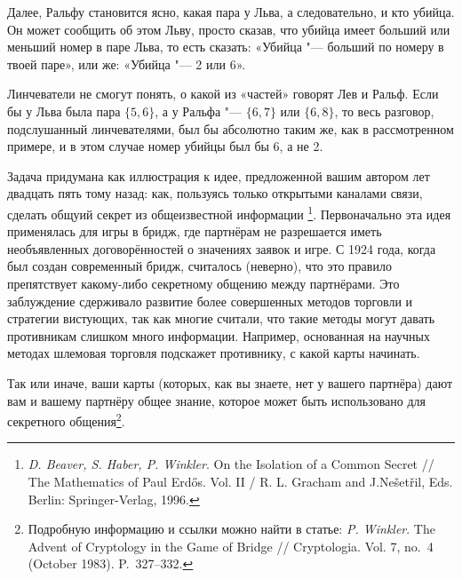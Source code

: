 \documentclass[twoside]{book}
\begin{document}
Далее, Ральфу становится ясно, какая пара у Льва, а следовательно, и кто  убийца.
Он может сообщить об этом Льву, просто сказав, что убийца  имеет больший или меньший номер в паре Льва, то есть сказать: «Убийца "--- больший по номеру в твоей паре», или же: «Убийца "--- 2 или 6».

Линчеватели не смогут понять, о какой из «частей» говорят Лев и Ральф.
Если бы у Льва была пара $\{5,6\}$, а у Ральфа "--- $\{6,7\}$ или $\{6,8\}$, то весь разговор, подслушанный линчевателями, был бы абсолютно таким же, как в рассмотренном примере, и в этом случае номер убийцы был бы 6, а не 2.
\heart

\medskip
Задача придумана как иллюстрация к идее, предложенной вашим автором лет двадцать пять тому назад:
как, пользуясь только открытыми каналами связи, сделать общуий секрет из общеизвестной информации%
\footnote{\emph{D. Beaver, S. Haber, P. Winkler}. On the Isolation of a Common Secret /\!/ {The Mathematics of Paul Erd\H{o}s}. Vol. II / R. L. Gracham and J.Ne\v{s}et\v{r}il, Eds. Berlin: Springer-Verlag, 1996.}.
Первоначально эта идея применялась для игры в бридж, где партнёрам не разрешается иметь необъявленных договорённостей о значениях заявок и игре.
С 1924 года, когда был создан современный бридж, считалось (неверно), что это правило препятствует какому-либо секретному общению между партнёрами.
Это заблуждение сдерживало развитие более совершенных методов торговли и стратегии вистующих, так как многие считали, что такие методы могут давать противникам слишком много информации.
Например, основанная на научных методах шлемовая торговля подскажет противнику, с какой карты начинать.

Так или иначе, ваши карты (которых, как вы знаете, нет у вашего партнёра) дают вам и вашему партнёру общее знание, которое может быть использовано для секретного общения\footnote{Подробную информацию и ссылки можно найти в статье: \emph{P. Winkler}. The Advent of Cryptology in the Game of Bridge /\!/ {Cryptologia}. Vol. 7, no.~4 (October 1983). P.~327--332.}.
\end{document}
